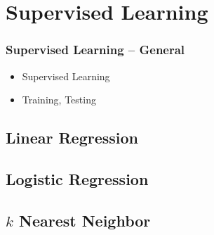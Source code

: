 \documentclass[english,final,compress]{beamer}
\begin{document}


\section{Supervised Learning}


\begin{frame}
    \frametitle{Supervised Learning -- General}
    \begin{itemize}
        \item Supervised Learning
        \item Training, Testing
    \end{itemize}
\end{frame}

\subsection{Linear Regression}



\subsection{Logistic Regression}



\subsection{$k$ Nearest Neighbor}


\end{document}
